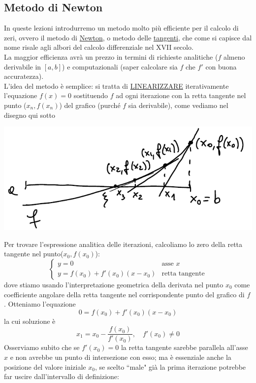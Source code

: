 \documentclass[12pt]{article}
\begin{document}
\subsection{Metodo di Newton}
In queste lezioni introdurremo un metodo molto più efficiente per il calcolo di zeri, ovvero il metodo di \uline{Newton}, o metodo delle \uline{tangenti}, che come si capisce dal nome risale agli albori del calcolo differenziale nel XVII secolo.\\
La maggior efficienza avrà un prezzo in termini di richieste analitiche ($f$ almeno derivabile in $[a, b]$) e computazionali (saper calcolare sia $f$ che $f'$ con buona accuratezza).\\
L'idea del metodo è semplice: si tratta di \uline{LINEARIZZARE} iterativamente l'equazione $f(x) = 0$ sostituendo $f$ ad ogni iterazione con la retta tangente nel punto ($x_n, f(x_n)$) del grafico (purché $f$ sia derivabile), come vediamo nel disegno qui sotto 
\begin{center}
    \includegraphics[scale=0.7]{pagina5_1.png}
\end{center}
Per trovare l'espressione analitica delle iterazioni, calcoliamo lo zero della retta tangente nel punto($x_0,f(x_0)$):
\[ \begin{cases}
    y = 0 & \text{asse } x\\
    y = f(x_0) + f'(x_0)(x-x_0) & \text{retta tangente}
\end{cases}\]
dove stiamo usando l'interpretazione geometrica della derivata nel punto $x_0$ come coefficiente angolare della retta tangente nel corrispondente punto del grafico di $f$. Otteniamo l'equazione 
\[ 0=f(x_0)+ f'(x_0)(x-x_0) \]
la cui soluzione è
\[ x_1=x_0-\frac{f(x_0)}{f'(x_0)}, \quad f'(x_0)\neq 0 \]
Osserviamo subito che se $f'(x_0)=0$ la retta tangente sarebbe parallela all'asse $x$ e non avrebbe un punto di intersezione con esso; ma è essenziale anche la posizione del valore iniziale $x_0$, se scelto ``male" già la prima iterazione potrebbe far uscire dall'intervallo di definizione:\\
\end{document}
